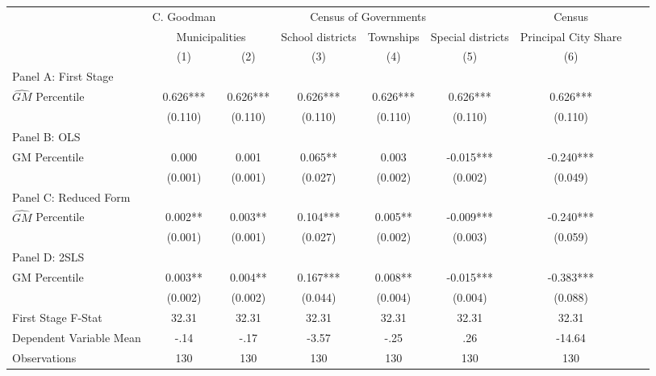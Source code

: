  \begin{tabular}{l*{8}{c}} \toprule
&\multicolumn{1}{c}{C. Goodman}&\multicolumn{4}{c}{Census of Governments}&\multicolumn{1}{c}{Census}\\\cmidrule(lr){2-2}\cmidrule(lr){3-6}\cmidrule(lr){7-7}
&\multicolumn{2}{c}{Municipalities}&\multicolumn{1}{c}{School districts}&\multicolumn{1}{c}{Townships}&\multicolumn{1}{c}{Special districts}&\multicolumn{1}{c}{Principal City Share}\\\cmidrule(lr){2-3}\cmidrule(lr){4-6}\cmidrule(lr){7-7}
&\multicolumn{1}{c}{(1)}&\multicolumn{1}{c}{(2)}&\multicolumn{1}{c}{(3)}&\multicolumn{1}{c}{(4)}&\multicolumn{1}{c}{(5)}&\multicolumn{1}{c}{(6)}\\
\cmidrule(lr){1-7}
\multicolumn{6}{l}{Panel A: First Stage}\\
\cmidrule(lr){1-7}
$\widehat{GM}$ Percentile&    0.626***&    0.626***&    0.626***&    0.626***&    0.626***&    0.626***\\
                &  (0.110)   &  (0.110)   &  (0.110)   &  (0.110)   &  (0.110)   &  (0.110)   \\
\cmidrule(lr){1-7}
\multicolumn{6}{l}{Panel B: OLS}\\
\cmidrule(lr){1-7}
GM Percentile   &    0.000   &    0.001   &    0.065** &    0.003   &   -0.015***&   -0.240***\\
                &  (0.001)   &  (0.001)   &  (0.027)   &  (0.002)   &  (0.002)   &  (0.049)   \\
\cmidrule(lr){1-7}
\multicolumn{6}{l}{Panel C: Reduced Form}\\
\cmidrule(lr){1-7}
$\widehat{GM}$ Percentile&    0.002** &    0.003** &    0.104***&    0.005** &   -0.009***&   -0.240***\\
                &  (0.001)   &  (0.001)   &  (0.027)   &  (0.002)   &  (0.003)   &  (0.059)   \\
\cmidrule(lr){1-7}
\multicolumn{6}{l}{Panel D: 2SLS}\\
\cmidrule(lr){1-7}
GM Percentile   &    0.003** &    0.004** &    0.167***&    0.008** &   -0.015***&   -0.383***\\
                &  (0.002)   &  (0.002)   &  (0.044)   &  (0.004)   &  (0.004)   &  (0.088)   \\
\midrule
First Stage F-Stat&    32.31   &    32.31   &    32.31   &    32.31   &    32.31   &    32.31   \\
Dependent Variable Mean&     -.14   &     -.17   &    -3.57   &     -.25   &      .26   &   -14.64   \\
Observations    &      130   &      130   &      130   &      130   &      130   &      130   \\
       \bottomrule \end{tabular}
